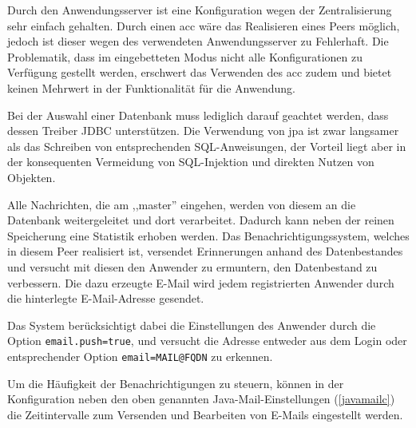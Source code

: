 \documentclass[oneside, ngerman, toc=bibliography,bibliography=totoc,listof=entryprefix, open=right,numbers=noenddot,fontsize=12pt]{scrbook}
\begin{document}
Durch den Anwendungsserver ist eine Konfiguration wegen der Zentralisierung sehr einfach gehalten. Durch einen \acrfull{acc} wäre das Realisieren eines Peers möglich, jedoch ist dieser wegen des verwendeten Anwendungsserver zu Fehlerhaft. Die Problematik, dass im eingebetteten Modus nicht alle Konfigurationen zu Verfügung gestellt werden, erschwert das Verwenden des \acrshort{acc} zudem und bietet keinen Mehrwert in der Funktionalität für die Anwendung.

Bei der Auswahl einer Datenbank muss lediglich darauf geachtet werden, dass dessen Treiber JDBC unterstützen. 
Die Verwendung von \acrshort{jpa} ist zwar langsamer als das Schreiben von entsprechenden SQL-Anweisungen, der Vorteil liegt aber in der konsequenten Vermeidung von SQL-Injektion und direkten Nutzen von Objekten.


Alle Nachrichten, die am ,,master'' eingehen, werden von diesem an die Datenbank weitergeleitet und dort verarbeitet. Dadurch kann neben der reinen Speicherung eine Statistik erhoben werden. Das Benachrichtigungssystem, welches in diesem Peer realisiert ist, versendet Erinnerungen anhand des Datenbestandes und versucht mit diesen den Anwender zu ermuntern, den Datenbestand zu verbessern.
Die dazu erzeugte E-Mail wird jedem registrierten Anwender durch die hinterlegte E-Mail-Adresse gesendet.

Das System berücksichtigt dabei die Einstellungen des Anwender durch die Option \verb|email.push=true|, und versucht die Adresse entweder aus dem Login oder entsprechender Option \verb|email=MAIL@FQDN| zu erkennen.

Um die Häufigkeit der Benachrichtigungen zu steuern, können in der Konfiguration neben den oben genannten Java-Mail-Einstellungen (\ref{javamailc}) die Zeitintervalle zum Versenden und Bearbeiten von E-Mails eingestellt werden.
\end{document}
